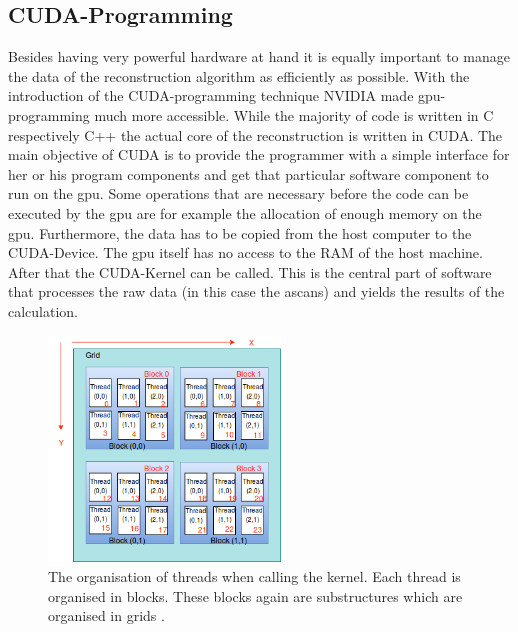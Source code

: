 \subsection{CUDA-Programming}
Besides having very powerful hardware at hand it is equally important to manage the data of the  reconstruction algorithm as efficiently as possible. With the introduction of the CUDA-programming technique NVIDIA made \ac{gpu}-programming much more accessible.
While the majority of code is written in C respectively C++ the actual core of the reconstruction is written in CUDA. The main objective of CUDA is to provide the programmer with a simple interface for her or his program components and get that particular software component to run on the \ac{gpu}. Some operations that are necessary before the code can be executed by the \ac{gpu} are for example the allocation of enough memory on the \ac{gpu}. Furthermore, the data has to be copied from the host computer to the CUDA-Device. The \ac{gpu} itself has no access to the RAM of the host machine. After that the CUDA-Kernel can be called. This is the central part of software that processes the raw data (in this case the \acp{ascan}) and yields the results of the calculation. 


\begin{figure}[H]
    \centering
    \includegraphics[width=0.55\textwidth]{Graphics/CudaIndexing.png}
    \caption{The organisation of threads when calling the kernel. Each thread is organised in blocks. These blocks again are substructures which are organised in grids \cite{cuda_indexing_guide}.}
    \label{cuda_index}
\end{figure}

